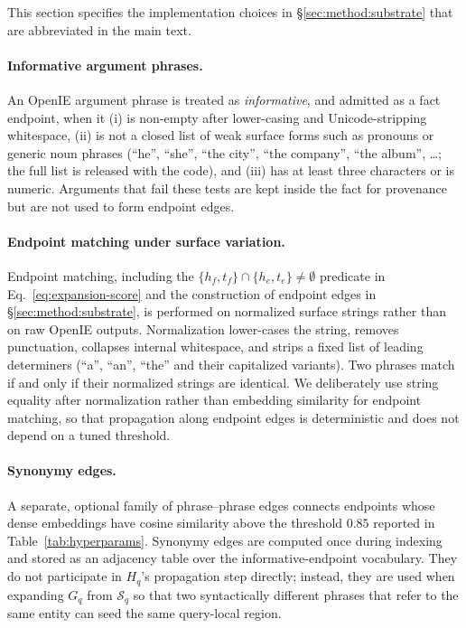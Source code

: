 This section specifies the implementation choices in
\S\ref{sec:method:substrate} that are abbreviated in the main text.

\paragraph{Informative argument phrases.}
An OpenIE argument phrase is treated as \emph{informative}, and
admitted as a fact endpoint, when it (i) is non-empty after
lower-casing and Unicode-stripping whitespace, (ii) is not a closed
list of weak surface forms such as pronouns or generic noun phrases
(``he'', ``she'', ``the city'', ``the company'', ``the album'',
\ldots; the full list is released with the code), and (iii) has at
least three characters or is numeric. Arguments that fail these
tests are kept inside the fact for provenance but are not used to
form endpoint edges.

\paragraph{Endpoint matching under surface variation.}
Endpoint matching, including the
$\{h_f,t_f\}\cap\{h_e,t_e\}\neq\emptyset$ predicate in
Eq.~\ref{eq:expansion-score} and the construction of endpoint edges
in \S\ref{sec:method:substrate}, is performed on normalized surface
strings rather than on raw OpenIE outputs. Normalization lower-cases
the string, removes punctuation, collapses internal whitespace, and
strips a fixed list of leading determiners (``a'', ``an'', ``the''
and their capitalized variants). Two phrases match if and only if
their normalized strings are identical. We deliberately use string
equality after normalization rather than embedding similarity for
endpoint matching, so that propagation along endpoint edges is
deterministic and does not depend on a tuned threshold.

\paragraph{Synonymy edges.}
A separate, optional family of phrase--phrase edges connects
endpoints whose dense embeddings have cosine similarity above the
threshold $0.85$ reported in Table~\ref{tab:hyperparams}. Synonymy
edges are computed once during indexing and stored as an adjacency
table over the informative-endpoint vocabulary. They do not
participate in $H_q$'s propagation step directly; instead, they are
used when expanding $G_q$ from $\mathcal{S}_q$ so that two
syntactically different phrases that refer to the same entity can
seed the same query-local region.

